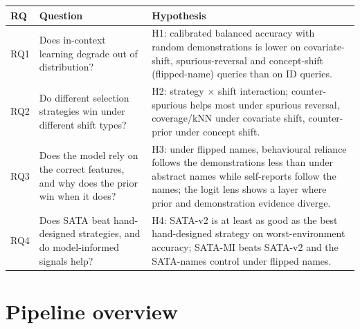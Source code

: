 \documentclass[11pt,a4paper]{article}
\newcommand{\1}{\mathbf{1}}
\theoremstyle{plain}
\theoremstyle{definition}
\theoremstyle{remark}
\begin{document}
\begin{center}
\begin{tabular}{L{1.1cm}L{6.6cm}L{7.6cm}}
\toprule
\textbf{RQ} & \textbf{Question} & \textbf{Hypothesis} \\
\midrule
RQ1 & Does in-context learning degrade out of distribution? &
H1: calibrated balanced accuracy with random demonstrations is lower on
covariate-shift, spurious-reversal and concept-shift (flipped-name) queries
than on ID queries. \\
RQ2 & Do different selection strategies win under different shift types? &
H2: strategy $\times$ shift interaction; counter-spurious helps most under
spurious reversal, coverage/kNN under covariate shift, counter-prior under
concept shift. \\
RQ3 & Does the model rely on the correct features, and why does the prior
win when it does? &
H3: under flipped names, behavioural reliance follows the demonstrations
less than under abstract names while self-reports follow the names; the
logit lens shows a layer where prior and demonstration evidence diverge. \\
RQ4 & Does SATA beat hand-designed strategies, and do model-informed
signals help? &
H4: SATA-v2 is at least as good as the best hand-designed strategy on
worst-environment accuracy; SATA-MI beats SATA-v2 and the SATA-names control
under flipped names. \\
\bottomrule
\end{tabular}
\end{center}

\section{Pipeline overview}
\end{document}
